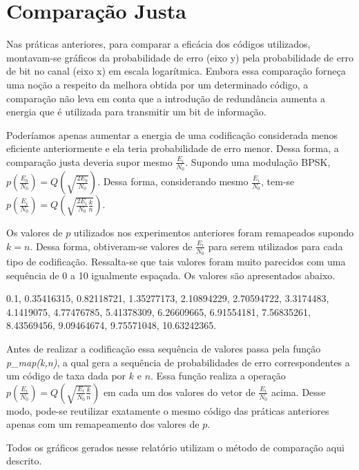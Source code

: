 \section{Comparação Justa}
Nas práticas anteriores, para comparar a eficácia dos códigos utilizados, montavam-se gráficos da probabilidade de erro (eixo y) pela probabilidade de erro de bit no canal (eixo x) em escala logarítmica. Embora essa comparação forneça uma noção  a respeito da melhora obtida por um determinado código, a comparação não leva em conta que a introdução de redundância aumenta a energia que é utilizada para transmitir um bit de informação.

Poderíamos apenas aumentar a energia de uma codificação considerada menos eficiente anteriormente e ela teria probabilidade de erro menor. Dessa forma, a comparação justa deveria supor mesmo $\frac{E_i}{N_0}$. Supondo uma modulação BPSK, $p\left(\frac{E_b}{N_0}\right) = Q\left(\sqrt{\frac{2E_b}{N_0}}\right)$. Dessa forma, considerando mesmo $\frac{E_i}{N_0}$, tem-se $p\left(\frac{E_i}{N_0}\right) = Q\left(\sqrt{\frac{2E_i}{N_0}\frac{k}{n}}\right)$.

Os valores de $p$ utilizados nos experimentos anteriores foram remapeados supondo $k = n$. Dessa forma, obtiveram-se valores de $\frac{E_i}{N_0}$ para serem utilizados para cada tipo de codificação. Ressalta-se que tais valores foram muito parecidos com uma sequência de 0 a 10 igualmente espaçada. Os valores são apresentados abaixo.

0.1, 0.35416315, 0.82118721, 1.35277173, 2.10894229, 2.70594722,
	3.3174483, 4.1419075, 4.77476785, 5.41378309, 6.26609665, 6.91554181,
	7.56835261, 8.43569456, 9.09464674, 9.75571048, 10.63242365.
	
Antes de realizar a codificação essa sequência de valores passa pela função \textit{p\_map(k,n)}, a qual gera a sequência de probabilidades de erro correspondentes a um código de taxa dada por $k$ e $n$. Essa função realiza a operação $p\left(\frac{E_i}{N_0}\right) = Q\left(\sqrt{\frac{E_i}{N_0}\frac{k}{n}}\right)$ em cada um dos valores do vetor de $\frac{E_i}{N_0}$ acima. Desse modo, pode-se reutilizar exatamente o mesmo código das práticas anteriores apenas com um remapeamento dos valores de $p$.

Todos os gráficos gerados nesse relatório utilizam o método de comparação aqui descrito.